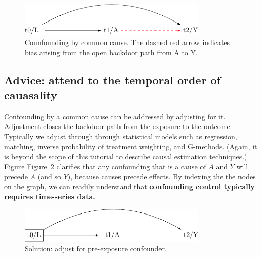 \documentclass[
  singlecolumn]{report}
\begin{document}
\begin{figure}

{\centering \includegraphics[width=0.8\textwidth,height=\textheight]{causal-dags_files/figure-pdf/fig-dag-common-cause-1.pdf}

}

\caption{\label{fig-dag-common-cause}Counfounding by common cause. The
dashed red arrow indicates bias arising from the open backdoor path from
A to Y.}

\end{figure}

\hypertarget{advice-attend-to-the-temporal-order-of-cauasality}{%
\subsection{Advice: attend to the temporal order of
cauasality}\label{advice-attend-to-the-temporal-order-of-cauasality}}

Confounding by a common cause can be addressed by adjusting for it.
Adjustment closes the backdoor path from the exposure to the outcome.
Typically we adjust through through statistical models such as
regression, matching, inverse probability of treatment weighting, and
G-methods. (Again, it is beyond the scope of this tutorial to describe
causal estimation techniques.) Figure
Figure~\ref{fig-dag-common-cause-solution} clarifies that any
confounding that is a cause of \(A\) and \(Y\) will precede \(A\) (and
so \(Y\)), because causes precede effects. By indexing the the nodes on
the graph, we can readily understand that \textbf{confounding control
typically requires time-series data.}

\begin{figure}

{\centering \includegraphics[width=0.8\textwidth,height=\textheight]{causal-dags_files/figure-pdf/fig-dag-common-cause-solution-1.pdf}

}

\caption{\label{fig-dag-common-cause-solution}Solution: adjust for
pre-exposure confounder.}

\end{figure}
\end{document}
